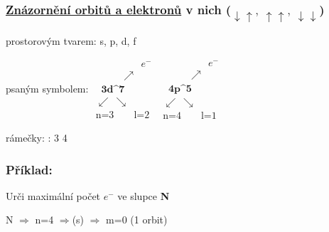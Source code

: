 \subsubsection[Znázornění orbitů a elektronů]{\underline{Znázornění orbitů a elektronů} v nich ($\downarrow \uparrow,~ \uparrow \uparrow,~ \downarrow\downarrow$)}
\begin{description}
    \TabPositions{0em, 12em}
    \vspace{1em}
    \item[a)] prostorovým tvarem: \tab s, p, d, f
    \vspace{2em}
    \item[b)] psaným symbolem: \tab \(
        \begin{array}{c}
            \qquad\qquad\;\; e^-\\
            \qquad \;\;\; \nearrow \\
            \;\;\textbf{3d^7} \\
            \swarrow~\searrow \\
            \mbox{n=3} \qquad \mbox{l=2}
        \end{array}
    \)
    \hspace{6em}
    \(
        \begin{array}{c}
            \qquad\qquad\;\; e^-\\
            \qquad \;\;\; \nearrow \\
            \;\;\textbf{4p^5} \\
            \swarrow~\searrow \\
            \mbox{n=4} \qquad \mbox{l=1}
        \end{array}
    \)
    \vspace{2em}
    \item[c)] rámečky: \tab  : 3 \fbox{$\downarrow\uparrow$}\fbox{$\downarrow\uparrow$}\fbox{$\downarrow$ }\fbox{$\downarrow$ }\fbox{$\downarrow$ } \hspace{3em} 4 \fbox{$\downarrow\uparrow$}\fbox{$\downarrow\uparrow$}\fbox{$\downarrow$ }
\end{description}

\newpage
\subsubsection*{\textbf{Příklad:}}
Urči maximální počet $e^-$ ve slupce \textbf{N}

\smallskip
\TabPositions{0em, 7em}
N $\Rightarrow$ n=4 $\Rightarrow$(s) $\Rightarrow$ m=0 (1 orbit)

